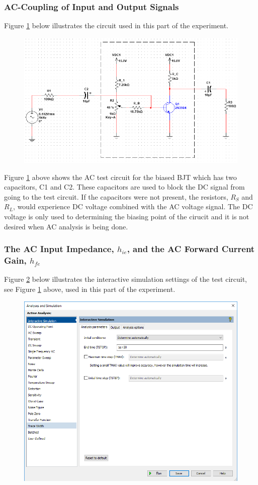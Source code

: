 \documentclass{article}
\begin{document}
	\pagebreak
	
	\subsubsection{AC-Coupling of Input and Output Signals}
	Figure \ref{f24} below illustrates the circuit used in this part of the experiment.
	\begin{figure}[!ht]
		\centering
		\includegraphics[width=0.8\linewidth]{part4-b-circuit.png}
		\label{f24}
	\end{figure}
	
	\noindent Figure \ref{f24} above shows the AC test circuit for the biased BJT which has two capacitors, C1 and C2.
	These capacitors are used to block the DC signal from going to the test circuit.
	If the capacitors were not present, the resistors, $R_S$ and $R_L$, would experience DC voltage combined with the AC voltage signal.
	The DC voltage is only used to determining the biasing point of the cirucit and it is not desired when AC analysis is being done.
	
	\pagebreak
	
	\subsubsection{The AC Input Impedance, $h_{ie}$, and the AC Forward Current Gain, $h_{fe}$}
	Figure \ref{f25} below illustrates the interactive simulation settings of the test circuit, see Figure \ref{f24} above, used in this part of the experiment.
	\begin{figure}[!ht]
		\centering
		\includegraphics[width=0.55\linewidth]{part4-c-DcOperatingSweep.png}
		\label{f25}
	\end{figure}
	
\end{document}
